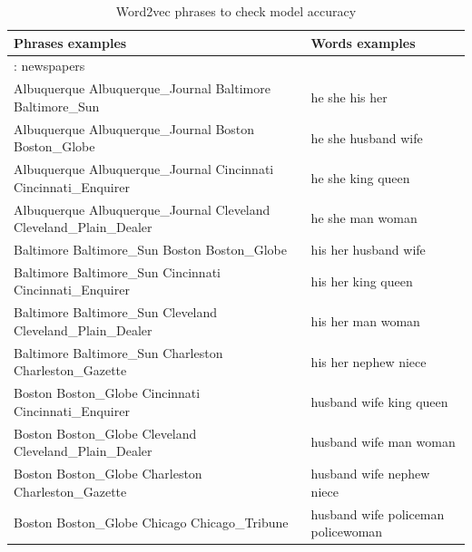 \documentclass[letterpaper]{article}
\begin{document}
      
      
\begin{table}[ht]
	\centering
	\begin{tabular}{|p{0.65\linewidth}|p{0.35\linewidth}|}
		\hline
		Phrases examples & Words examples\\
		\hline	  
	    \hline
: newspapers\\
\hline
Albuquerque Albuquerque\_Journal Baltimore Baltimore\_Sun & he she his her\\
Albuquerque Albuquerque\_Journal Boston Boston\_Globe & he she husband wife\\
Albuquerque Albuquerque\_Journal Cincinnati Cincinnati\_Enquirer & he she king queen\\
Albuquerque Albuquerque\_Journal Cleveland Cleveland\_Plain\_Dealer & he she man woman\\
\hline
Baltimore Baltimore\_Sun Boston Boston\_Globe& his her husband wife\\
Baltimore Baltimore\_Sun Cincinnati Cincinnati\_Enquirer & his her king queen\\
Baltimore Baltimore\_Sun Cleveland Cleveland\_Plain\_Dealer & his her man woman\\
Baltimore Baltimore\_Sun Charleston Charleston\_Gazette & his her nephew niece\\
\hline
Boston Boston\_Globe Cincinnati Cincinnati\_Enquirer & husband wife king queen	\\
Boston Boston\_Globe Cleveland Cleveland\_Plain\_Dealer & husband wife man woman\\
Boston Boston\_Globe Charleston Charleston\_Gazette & husband wife nephew niece\\
Boston Boston\_Globe Chicago Chicago\_Tribune & husband wife policeman policewoman\\

  \hline
  	   	\end{tabular}
\caption{Word2vec phrases to check model accuracy}
\label{tab:phrases-check-accuracy}
\end{table}	
	
\end{document}
